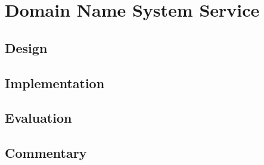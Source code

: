\section{Domain Name System Service}
\label{sec:dns}

\subsection{Design}

\subsection{Implementation}

\subsection{Evaluation}

\subsection{Commentary}